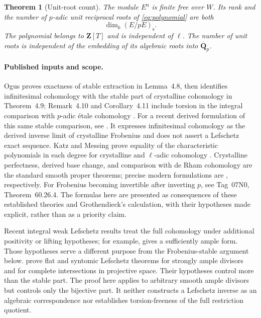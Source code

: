 \documentclass[11pt]{article}
\newtheorem{theorem}{Theorem}[section]
\theoremstyle{remark}\newtheorem{remark}[theorem]{Remark}
\newcommand{\st}{\mathrm{s}}
\newcommand{\uF}{\mathrm{u}}
\begin{document}
\begin{theorem}[Unit-root count]\label{thm:units}
The module $E^{\uF}$ is finite free over $W$. Its rank and the number of $p$-adic unit reciprocal roots of \eqref{eq:polynomial} are both
\[
 \dim_k(E/pE)_{\st}.
\]
The polynomial belongs to $\mathbf Z[T]$ and is independent of $\ell$. The number of unit roots is independent of the embedding of its algebraic roots into $\overline{\mathbf Q}_p$.
\end{theorem}

\paragraph{Published inputs and scope.}
Ogus proves exactness of stable extraction in Lemma~4.8, then identifies infinitesimal cohomology with the stable part of crystalline cohomology in Theorem~4.9; Remark~4.10 and Corollary~4.11 include torsion in the integral comparison with $p$-adic \'etale cohomology \citep[pp.~314--315]{Ogus}. For a recent derived formulation of this same stable comparison, see \citet[Theorems~3.3.2--3.3.3]{Grammatica}. It expresses infinitesimal cohomology as the derived inverse limit of crystalline Frobenius and does not assert a Lefschetz exact sequence. Katz and Messing prove equality of the characteristic polynomials in each degree for crystalline and $\ell$-adic cohomology \citep[Theorem~1, p.~74]{KatzMessing}. Crystalline perfectness, derived base change, and comparison with de Rham cohomology are the standard smooth proper theorems; precise modern formulations are \citet[Tags~07MY, 07MU, and~07MW]{Stacks}, respectively. For Frobenius becoming invertible after inverting $p$, see Tag~07N0, Theorem~60.26.4. The formulas here are presented as consequences of these established theories and Grothendieck's calculation, with their hypotheses made explicit, rather than as a priority claim.

Recent integral weak Lefschetz results treat the full cohomology under additional positivity or lifting hypotheses; for example, \citet[Lemma~2.12, pp.~242--243]{BMS} gives a sufficiently ample form. Those hypotheses serve a different purpose from the Frobenius-stable argument below. \citet[Theorems~1.1.1 and~1.1.5, pp.~1850--1852]{CotnerZavyalov} prove flat and syntomic Lefschetz theorems for strongly ample divisors and for complete intersections in projective space. Their hypotheses control more than the stable part. The proof here applies to arbitrary smooth ample divisors but controls only the bijective part. It neither constructs a Lefschetz inverse as an algebraic correspondence nor establishes torsion-freeness of the full restriction quotient.
\end{document}

